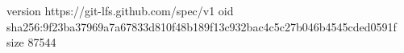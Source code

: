 version https://git-lfs.github.com/spec/v1
oid sha256:9f23ba37969a7a67833d810f48b189f13c932bac4c5c27b046b4545cded0591f
size 87544
